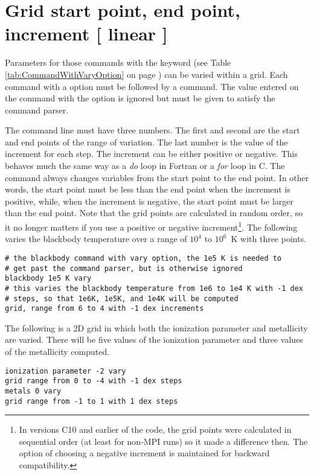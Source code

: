 \section{Grid start point, end point, increment [ linear ]}

Parameters for those commands with the  keyword
(see Table \ref{tab:CommandWithVaryOption}
on page \pageref{tab:CommandWithVaryOption}) can be varied
within a grid.
Each
command with a  option must be followed by a  command.
The value
entered on the command with the  option is
ignored but must be given
to satisfy the command parser.

The  command line must have three numbers.
The first and second
are the start and end points of the range of variation.
The last number
is the value of the increment for each step.
The increment can be either positive or negative.
This behaves much the same
way as a \emph{do} loop in Fortran or a \emph{for} loop in C.
The  command always changes variables from the start point
to the end point.
In other words, the start point must be less than the end point when
the increment is positive, while, when the increment is negative, the start
point must be larger than the end point. Note that the
grid points are calculated in random order, so it no longer
matters if you use a positive or negative increment\footnote{In versions
C10 and earlier of the code, the grid points were calculated in sequential
order (at least for non-MPI runs) so it made a difference then. The option of
choosing a negative increment is maintained for backward compatibility.}.
The following varies the
blackbody temperature over a range of $10^4$ to $10^6$~K with three points.
\begin{verbatim}
# the blackbody command with vary option, the 1e5 K is needed to
# get past the command parser, but is otherwise ignored
blackbody 1e5 K vary
# this varies the blackbody temperature from 1e6 to 1e4 K with -1 dex
# steps, so that 1e6K, 1e5K, and 1e4K will be computed
grid, range from 6 to 4 with -1 dex increments
\end{verbatim}
The following is a 2D grid in which both the ionization parameter and
metallicity are varied.
There will be five values of the ionization
parameter and three values of the metallicity computed.
\begin{verbatim}
ionization parameter -2 vary
grid range from 0 to -4 with -1 dex steps
metals 0 vary
grid range from -1 to 1 with 1 dex steps
\end{verbatim}

